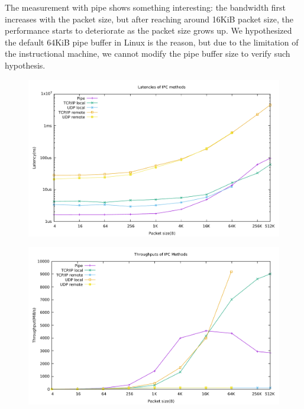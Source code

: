 The measurement with pipe shows something interesting: the bandwidth first increases with the packet size, but after reaching around 16KiB packet size, the performance starts to deteriorate as the packet size grows up. We hypothesized the default 64KiB pipe buffer in Linux is the reason, but due to the limitation of the instructional machine, we cannot modify the pipe buffer size to verify such hypothesis.

\begin{figure}[!ht]
\includegraphics[width=.7\linewidth]{figures/latency}
\label{figure:latency}
\end{figure}

\begin{figure}[!ht]
    \includegraphics[width=.7\linewidth]{figures/throughput.pdf}
    \label{figure:throughput}
\end{figure}
